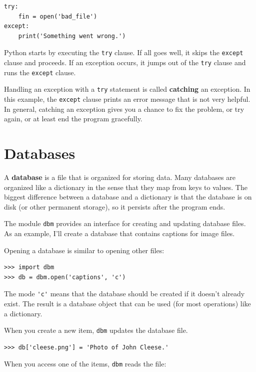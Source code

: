 \documentclass[10pt]{book}
\begin{document}
\begin{verbatim}
try:
    fin = open('bad_file')
except:
    print('Something went wrong.')
\end{verbatim}
%
Python starts by executing the {\tt try} clause.  If all goes
well, it skips the {\tt except} clause and proceeds.  If an
exception occurs, it jumps out of the {\tt try} clause and
runs the {\tt except} clause.

Handling an exception with a {\tt try} statement is called {\bf
catching} an exception.  In this example, the {\tt except} clause
prints an error message that is not very helpful.  In general,
catching an exception gives you a chance to fix the problem, or try
again, or at least end the program gracefully.


\section{Databases}

A {\bf database} is a file that is organized for storing data.  Many
databases are organized like a dictionary in the sense that they map
from keys to values.  The biggest difference between a database and a
dictionary is that the database is on disk (or other permanent
storage), so it persists after the program ends.   

The module {\tt dbm} provides an interface for creating
and updating database files.
As an example, I'll create a database
that contains captions for image files.

Opening a database is similar to opening other files:

\begin{verbatim}
>>> import dbm
>>> db = dbm.open('captions', 'c')
\end{verbatim}
%
The mode \verb"'c'" means that the database should be created if
it doesn't already exist.  The result is a database object
that can be used (for most operations) like a dictionary.

When you create a new item, {\tt dbm} updates the database file.

\begin{verbatim}
>>> db['cleese.png'] = 'Photo of John Cleese.'
\end{verbatim}
%
When you access one of the items, {\tt dbm} reads the file:
\end{document}
